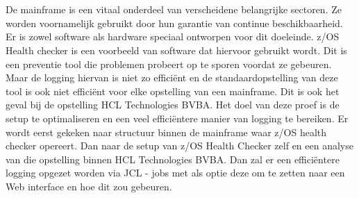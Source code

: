 
%
%

%



\chapter*{}
De mainframe is een vitaal onderdeel van verscheidene belangrijke sectoren. Ze worden voornamelijk gebruikt door hun garantie van continue beschikbaarheid. Er is zowel software als hardware speciaal ontworpen voor dit doeleinde. z/OS Health checker is een voorbeeld van software dat hiervoor gebruikt wordt. Dit is een preventie tool die problemen probeert op te sporen voordat ze gebeuren. Maar de logging hiervan is niet zo efficiënt en de standaardopstelling van deze tool is ook niet efficiënt voor elke opstelling van een mainframe. Dit is ook het geval bij de opstelling HCL Technologies BVBA. Het doel van deze proef is de setup te optimaliseren en een veel efficiëntere manier van logging te bereiken. Er wordt eerst gekeken naar structuur binnen de mainframe waar z/OS health checker opereert. Dan naar de setup van z/OS Health Checker zelf en een analyse van die opstelling binnen HCL Technologies BVBA. Dan zal er een efficiëntere logging opgezet worden via JCL - jobs met als optie deze om te zetten naar een Web interface en hoe dit zou gebeuren.
